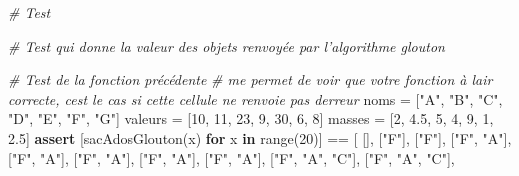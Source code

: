 \documentclass[
  paper=a4,
  ,captions=tableheading
]{scrartcl}
\newenvironment{Shaded}{}{}
\newcommand{\BuiltInTok}[1]{\textcolor[rgb]{0.00,0.50,0.00}{#1}}
\newcommand{\CommentTok}[1]{\textcolor[rgb]{0.38,0.63,0.69}{\textit{#1}}}
\newcommand{\ControlFlowTok}[1]{\textcolor[rgb]{0.00,0.44,0.13}{\textbf{#1}}}
\newcommand{\DecValTok}[1]{\textcolor[rgb]{0.25,0.63,0.44}{#1}}
\newcommand{\FloatTok}[1]{\textcolor[rgb]{0.25,0.63,0.44}{#1}}
\newcommand{\KeywordTok}[1]{\textcolor[rgb]{0.00,0.44,0.13}{\textbf{#1}}}
\newcommand{\NormalTok}[1]{#1}
\newcommand{\OperatorTok}[1]{\textcolor[rgb]{0.40,0.40,0.40}{#1}}
\newcommand{\StringTok}[1]{\textcolor[rgb]{0.25,0.44,0.63}{#1}}
\begin{document}
\begin{Shaded}
\begin{Highlighting}[]
\CommentTok{\# Test}
\end{Highlighting}
\end{Shaded}

\begin{Shaded}
\begin{Highlighting}[]
\CommentTok{\# Test qui donne la valeur des objets renvoyée par l’algorithme glouton}
\end{Highlighting}
\end{Shaded}

\begin{Shaded}
\begin{Highlighting}[]
\CommentTok{\# Test de la fonction précédente}
\CommentTok{\# me permet de voir que votre fonction à l\textquotesingle{}air correcte, c\textquotesingle{}est le cas si cette cellule ne renvoie pas d\textquotesingle{}erreur}
\NormalTok{noms }\OperatorTok{=}\NormalTok{ [}\StringTok{"A"}\NormalTok{, }\StringTok{"B"}\NormalTok{, }\StringTok{"C"}\NormalTok{, }\StringTok{"D"}\NormalTok{, }\StringTok{"E"}\NormalTok{, }\StringTok{"F"}\NormalTok{, }\StringTok{"G"}\NormalTok{]}
\NormalTok{valeurs }\OperatorTok{=}\NormalTok{ [}\DecValTok{10}\NormalTok{, }\DecValTok{11}\NormalTok{, }\DecValTok{23}\NormalTok{, }\DecValTok{9}\NormalTok{, }\DecValTok{30}\NormalTok{, }\DecValTok{6}\NormalTok{, }\DecValTok{8}\NormalTok{]}
\NormalTok{masses }\OperatorTok{=}\NormalTok{ [}\DecValTok{2}\NormalTok{, }\FloatTok{4.5}\NormalTok{, }\DecValTok{5}\NormalTok{, }\DecValTok{4}\NormalTok{, }\DecValTok{9}\NormalTok{, }\DecValTok{1}\NormalTok{, }\FloatTok{2.5}\NormalTok{]}
\ControlFlowTok{assert}\NormalTok{ [sacAdosGlouton(x) }\ControlFlowTok{for}\NormalTok{ x }\KeywordTok{in} \BuiltInTok{range}\NormalTok{(}\DecValTok{20}\NormalTok{)] }\OperatorTok{==}\NormalTok{ [}
\NormalTok{    [],}
\NormalTok{    [}\StringTok{"F"}\NormalTok{],}
\NormalTok{    [}\StringTok{"F"}\NormalTok{],}
\NormalTok{    [}\StringTok{"F"}\NormalTok{, }\StringTok{"A"}\NormalTok{],}
\NormalTok{    [}\StringTok{"F"}\NormalTok{, }\StringTok{"A"}\NormalTok{],}
\NormalTok{    [}\StringTok{"F"}\NormalTok{, }\StringTok{"A"}\NormalTok{],}
\NormalTok{    [}\StringTok{"F"}\NormalTok{, }\StringTok{"A"}\NormalTok{],}
\NormalTok{    [}\StringTok{"F"}\NormalTok{, }\StringTok{"A"}\NormalTok{],}
\NormalTok{    [}\StringTok{"F"}\NormalTok{, }\StringTok{"A"}\NormalTok{, }\StringTok{"C"}\NormalTok{],}
\NormalTok{    [}\StringTok{"F"}\NormalTok{, }\StringTok{"A"}\NormalTok{, }\StringTok{"C"}\NormalTok{],}

\end{Highlighting}
\end{Shaded}
\end{document}
